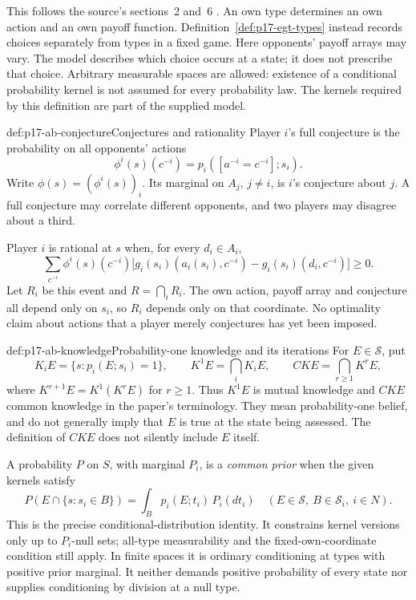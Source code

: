 This follows the source's sections~2 and~6
\parencite[pp.~1164--1166, 1173--1174]{AumannBrandenburger1995Epistemic}.
An own type determines an own action and an own payoff function.
Definition~\ref{def:p17-egt-types} instead records choices separately
from types in a fixed game. Here opponents' payoff arrays may vary.
The model describes which choice occurs at a state; it does not prescribe
that choice. Arbitrary measurable spaces are allowed: existence of a
conditional probability kernel is not assumed for every probability law.
The kernels required by this definition are part of the supplied model.

\begin{hbdefinition}{def:p17-ab-conjecture}{Conjectures and rationality}
Player \(i\)'s full conjecture is the probability on all opponents' actions
\[
 \phi^i(s)(c^{-i})=p_i([a^{-i}=c^{-i}];s_i).
\]
Write \(\phi(s)=(\phi^i(s))_i\). Its marginal on \(A_j\), \(j\ne i\),
is \(i\)'s conjecture about \(j\). A full conjecture may correlate
different opponents, and two players may disagree about a third.

Player \(i\) is rational at \(s\) when, for every \(d_i\in A_i\),
\[
 \sum_{c^{-i}}\phi^i(s)(c^{-i})
  \bigl[g_i(s_i)(a_i(s_i),c^{-i})
             -g_i(s_i)(d_i,c^{-i})\bigr]\geq0 .
\]
Let \(R_i\) be this event and \(R=\bigcap_iR_i\).
The own action, payoff array and conjecture all depend only on \(s_i\),
so \(R_i\) depends only on that coordinate. No optimality claim about
actions that a player merely conjectures has yet been imposed.
\end{hbdefinition}

\begin{hbdefinition}{def:p17-ab-knowledge}{Probability-one knowledge and its iterations}
For \(E\in\mathcal S\), put
\[
 K_iE=\{s:p_i(E;s_i)=1\},\qquad K^1E=\bigcap_iK_iE,\qquad
 CK E=\bigcap_{r\geq1}K^rE ,
\]
where \(K^{r+1}E=K^1(K^rE)\) for \(r\geq1\).
Thus \(K^1E\) is mutual knowledge and \(CKE\) common knowledge in the
paper's terminology. They mean probability-one belief, and do not
generally imply that \(E\) is true at the state being assessed.
The definition of \(CKE\) does not silently include \(E\) itself.

A probability \(P\) on \(S\), with marginal \(P_i\), is a
\emph{common prior} when the given kernels satisfy
\[
 P(E\cap\{s:s_i\in B\})
       =\int_B p_i(E;t_i)\,P_i(dt_i)
       \quad(E\in\mathcal S,\ B\in\mathcal S_i,\ i\in N).
 \tag{CP}
\]
This is the precise conditional-distribution identity. It constrains
kernel versions only up to \(P_i\)-null sets; all-type measurability
and the fixed-own-coordinate condition still apply. In finite spaces
it is ordinary conditioning at types with positive prior marginal.
It neither demands positive probability of every state nor supplies
conditioning by division at a null type.
\end{hbdefinition}

